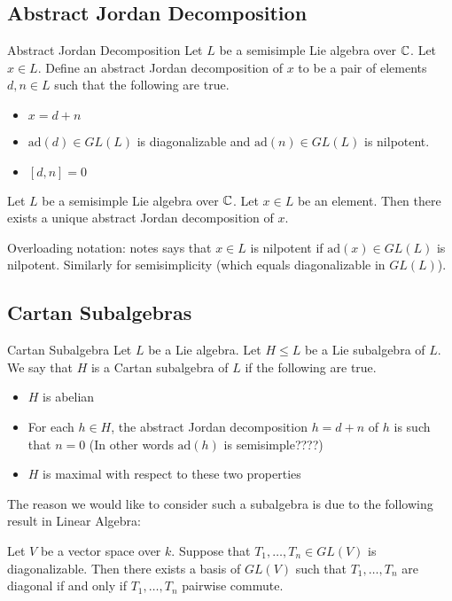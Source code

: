 \documentclass[a4paper]{article}
\begin{document}
\subsection{Abstract Jordan Decomposition}
\begin{defn}{Abstract Jordan Decomposition}{} Let $L$ be a semisimple Lie algebra over $\mathbb{C}$. Let $x\in L$. Define an abstract Jordan decomposition of $x$ to be a pair of elements $d,n\in L$ such that the following are true. 
\begin{itemize}
\item $x=d+n$
\item $\text{ad}(d)\in GL(L)$ is diagonalizable and $\text{ad}(n)\in GL(L)$ is nilpotent. 
\item $[d,n]=0$
\end{itemize}
\end{defn}

\begin{crl}{}{} Let $L$ be a semisimple Lie algebra over $\mathbb{C}$. Let $x\in L$ be an element. Then there exists a unique abstract Jordan decomposition of $x$. 
\end{crl}

Overloading notation: notes says that $x\in L$ is nilpotent if $\text{ad}(x)\in GL(L)$ is nilpotent. Similarly for semisimplicity (which equals diagonalizable in $GL(L)$). 

\subsection{Cartan Subalgebras}
\begin{defn}{Cartan Subalgebra}{} Let $L$ be a Lie algebra. Let $H\leq L$ be a Lie subalgebra of $L$. We say that $H$ is a Cartan subalgebra of $L$ if the following are true. 
\begin{itemize}
\item $H$ is abelian
\item For each $h\in H$, the abstract Jordan decomposition $h=d+n$ of $h$ is such that $n=0$ (In other words $\text{ad}(h)$ is semisimple????)
\item $H$ is maximal with respect to these two properties
\end{itemize}
\end{defn}

The reason we would like to consider such a subalgebra is due to the following result in Linear Algebra: 

\begin{lmm}{}{} Let $V$ be a vector space over $k$. Suppose that $T_1,\dots,T_n\in GL(V)$ is diagonalizable. Then there exists a basis of $GL(V)$ such that $T_1,\dots,T_n$ are diagonal if and only if $T_1,\dots,T_n$ pairwise commute. 
\end{lmm}
\end{document}
